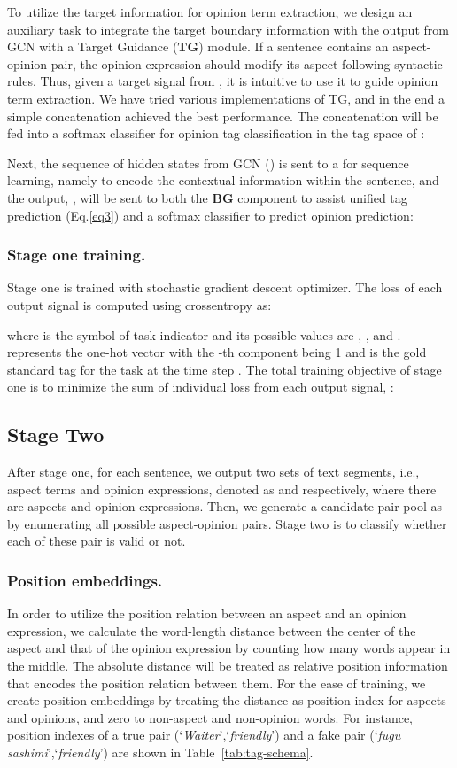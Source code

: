 \documentclass[letterpaper]{article} \usepackage{aaai20}  \usepackage{times}  \usepackage{helvet} \usepackage{courier}  \usepackage[hyphens]{url}  \usepackage{graphicx} \urlstyle{rm} \def\UrlFont{\rm}  \usepackage{graphicx}  \frenchspacing  \setlength{\pdfpagewidth}{8.5in}  \setlength{\pdfpageheight}{11in}
\begin{document}
To utilize the target information for opinion term extraction, we design an auxiliary task to integrate the target boundary information with the output from GCN with a Target Guidance (\textbf{TG}) module. If a sentence contains an aspect-opinion pair, the opinion expression should modify its aspect following syntactic rules. Thus, given a target signal from , it is intuitive to use it to guide opinion term extraction. We have tried various implementations of TG, and in the end a simple concatenation achieved the best performance. The concatenation will be fed into a softmax classifier for opinion tag classification in the tag space of :


Next, the sequence of hidden states from GCN () is sent to a  for sequence learning, namely to encode the contextual information within the sentence, and the output, , will be sent to both the \textbf{BG} component to assist unified tag prediction (Eq.\ref{eq3}) and a softmax classifier to predict opinion prediction:


\subsubsection{Stage one training.}
Stage one is trained with stochastic gradient descent optimizer. The loss of each output signal is computed using crossentropy as:

where  is the symbol of task indicator and its possible values are , ,  and .  represents the one-hot vector with the -th component being 1 and  is the gold standard tag for the task  at the time step . The total training objective of stage one is to minimize the sum of individual loss from each output signal, :



\subsection{Stage Two}
After stage one, for each sentence, we output two sets of text segments, i.e., aspect terms and opinion expressions, denoted as  and  respectively, where there are  aspects and  opinion expressions. Then, we generate a candidate pair pool as  by enumerating all possible aspect-opinion pairs. Stage two is to classify whether each of these pair is valid or not.

\subsubsection{Position embeddings.}
In order to utilize the position relation between an aspect and an opinion expression, we calculate the word-length distance between the center of the aspect and that of the opinion expression by counting how many words appear in the middle. The absolute distance will be treated as relative position information that encodes the position relation between them. For the ease of training, we create position embeddings by treating the distance as position index for aspects and opinions, and zero to non-aspect and non-opinion words. For instance, position indexes of a true pair (`\textit{Waiter}',`\textit{friendly}') and a fake pair (`\textit{fugu sashimi}',`\textit{friendly}') are shown in Table~\ref{tab:tag-schema}.
\end{document}
